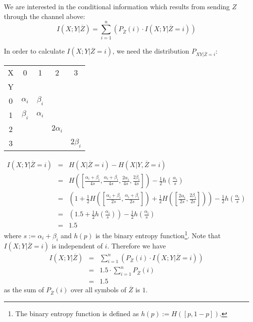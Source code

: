 \documentclass[a4paper, twoside, openany]{report}
\newcommand{\p}[1]{\textbf{#1}}
\newcommand{\al}{\alpha}
\newcommand{\be}{\beta}
\newcommand{\half}{\frac{1}{2}}
\newcommand{\ol}[1]{\overline{#1}}
\newcommand{\zol}{\ol{Z}}
\theoremstyle{plain}
\theoremstyle{definition}
\begin{document}
\noindent
We are interested in the conditional information which results from sending $Z$ through the channel above:
\[I(X;Y|\zol) = \sum_{i=1}^n{(P_{\zol}(i) \cdot I(X;Y|\zol=i))} \]

\noindent
In order to calculate $I(X;Y|\zol=i)$, we need the distribution $P_{XY|\zol=i}$:

\begin{center}
\begin{tabular}{|c||c|c|c|c|}
\hline
X      &     0     &     1     &     2      &      3     \\
Y      &           &           &            &            \\
\hline\hline
0     &\p{$\al_i$}&\p{$\be_i$}&            &            \\
\hline
1     &\p{$\be_i$}&\p{$\al_i$}&            &            \\
\hline
2     &           &           &\p{$2\al_i$}&            \\
\hline
3     &           &           &            &\p{$2\be_i$}\\
\hline
\end{tabular}
\end{center}


\begin{eqnarray*}
I(X;Y|\zol=i) & = & H(X|\zol=i) - H(X|Y,\zol=i) \\
              & = & H(\left[\frac{\al_i+\be_i}{4s}, \frac{\al_i+\be_i}{4s}, \frac{2\al_i}{4s}, \frac{2\be_i}{4s}\right]) - \half h(\frac{\al_i}{s}) \\
              & = & \left(1 + \half H(\left[\frac{\al_i+\be_i}{2s}, \frac{\al_i+\be_i}{2s}\right]) + \half H(\left[\frac{2\al_i}{2s}, \frac{2\be_i}{2s}\right])\right) - \half h(\frac{\al_i}{s}) \\
              & = & \left(1.5 + \half h(\frac{\al_i}{s})\right) - \half h(\frac{\al_i}{s}) \\
              & = & 1.5
\end{eqnarray*}
where $s := \al_i+\be_i$ and $h(p)$ is the binary entropy function\footnote{The binary entropy function is defined as $h(p) := H([p, 1-p])$.}. Note that $I(X;Y|\zol=i)$ is independent of $i$. Therefore we have
\begin{eqnarray*}
I(X;Y|\zol) & = & \sum_{i=1}^n{(P_{\zol}(i) \cdot I(X;Y|\zol=i))} \\
            & = & 1.5 \cdot \sum_{i=1}^n{P_{\zol}(i)} \\
            & = & 1.5
\end{eqnarray*}
as the sum of $P_{\zol}(i)$ over all symbols of $\zol$ is $1$.
\end{document}
